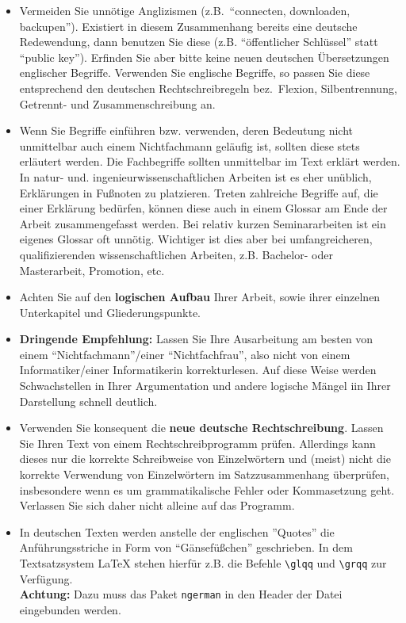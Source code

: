 \begin{itemize}
\item Vermeiden Sie unnötige Anglizismen (z.B.~"`connecten, downloaden, backupen"').
Existiert in diesem Zusammenhang bereits eine deutsche Redewendung, dann benutzen Sie diese (z.B. "`öffentlicher Schlüssel"' statt "`public key"').
Erfinden Sie aber bitte keine neuen deutschen Übersetzungen englischer Begriffe.
Verwenden Sie englische Begriffe, so passen Sie diese entsprechend den deutschen Rechtschreibregeln bez.~Flexion, Silbentrennung, Getrennt- und Zusammenschreibung an.
\item Wenn Sie Begriffe einführen bzw. verwenden, deren Bedeutung nicht unmittelbar auch einem Nichtfachmann geläufig ist, sollten diese stets erläutert werden. 
Die Fachbegriffe sollten unmittelbar im Text erklärt werden. 
In natur- und. ingenieurwissenschaftlichen Arbeiten ist es eher unüblich, Erklärungen in Fußnoten zu platzieren. 
Treten zahlreiche Begriffe auf, die einer Erklärung bedürfen, können diese auch in einem Glossar am Ende der Arbeit zusammengefasst werden.
Bei relativ kurzen Seminararbeiten ist ein eigenes Glossar oft unnötig. 
Wichtiger ist dies aber bei umfangreicheren, qualifizierenden wissenschaftlichen Arbeiten, z.B. Bachelor- oder Masterarbeit, Promotion, etc.
\item Achten Sie auf den {\bf logischen Aufbau} Ihrer Arbeit, sowie ihrer einzelnen Unterkapitel und Gliederungspunkte.
\item {\bf Dringende Empfehlung:} Lassen Sie Ihre Ausarbeitung am besten von einem "`Nichtfachmann"'/einer "`Nichtfachfrau"', also nicht von einem Informatiker/einer Informatikerin korrekturlesen.
Auf diese Weise werden Schwachstellen in Ihrer Argumentation und andere logische Mängel iin Ihrer Darstellung schnell deutlich.
\item Verwenden Sie konsequent die {\bf neue deutsche Rechtschreibung}.
Lassen Sie Ihren Text von einem Rechtschreibprogramm prüfen.
Allerdings kann dieses nur die korrekte Schreibweise von Einzelwörtern und (meist) nicht die korrekte Verwendung von Einzelwörtern im Satzzusammenhang überprüfen, insbesondere wenn es um grammatikalische Fehler oder Kommasetzung geht.
Verlassen Sie sich daher nicht alleine auf das Programm.
\item In deutschen Texten werden anstelle der englischen ''Quotes'' die Anführungsstriche in Form von "`Gänsefüßchen"' geschrieben. 
In dem Textsatzsystem {\LaTeX} stehen hierfür z.B. die Befehle \verb|\glqq| und \verb|\grqq| zur Verfügung. \\
{\bf Achtung:} Dazu muss das Paket {\tt ngerman} in den Header der Datei eingebunden werden.
\end{itemize}



